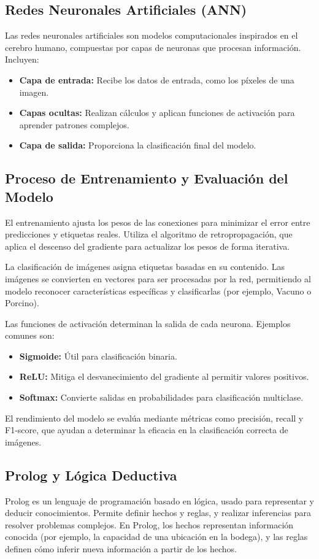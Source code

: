 \documentclass[12pt]{article}
\begin{document}
\subsection{Redes Neuronales Artificiales (ANN)}
Las redes neuronales artificiales son modelos computacionales inspirados en el cerebro humano, compuestas por capas de neuronas que procesan información. Incluyen:
\begin{itemize}
    \item \textbf{Capa de entrada:} Recibe los datos de entrada, como los píxeles de una imagen.
    \item \textbf{Capas ocultas:} Realizan cálculos y aplican funciones de activación para aprender patrones complejos.
    \item \textbf{Capa de salida:} Proporciona la clasificación final del modelo.
\end{itemize}

\subsection{Proceso de Entrenamiento y Evaluación del Modelo}
El entrenamiento ajusta los pesos de las conexiones para minimizar el error entre predicciones y etiquetas reales. Utiliza el algoritmo de retropropagación, que aplica el descenso del gradiente para actualizar los pesos de forma iterativa.

La clasificación de imágenes asigna etiquetas basadas en su contenido. Las imágenes se convierten en vectores para ser procesadas por la red, permitiendo al modelo reconocer características específicas y clasificarlas (por ejemplo, Vacuno o Porcino). 

Las funciones de activación determinan la salida de cada neurona. Ejemplos comunes son:
\begin{itemize}
    \item \textbf{Sigmoide:} Útil para clasificación binaria.
    \item \textbf{ReLU:} Mitiga el desvanecimiento del gradiente al permitir valores positivos.
    \item \textbf{Softmax:} Convierte salidas en probabilidades para clasificación multiclase.
\end{itemize}
El rendimiento del modelo se evalúa mediante métricas como precisión, recall y F1-score, que ayudan a determinar la eficacia en la clasificación correcta de imágenes.

\subsection{Prolog y Lógica Deductiva}
Prolog es un lenguaje de programación basado en lógica, usado para representar y deducir conocimientos. Permite definir hechos y reglas, y realizar inferencias para resolver problemas complejos. En Prolog, los hechos representan información conocida (por ejemplo, la capacidad de una ubicación en la bodega), y las reglas definen cómo inferir nueva información a partir de los hechos.\\
\end{document}
